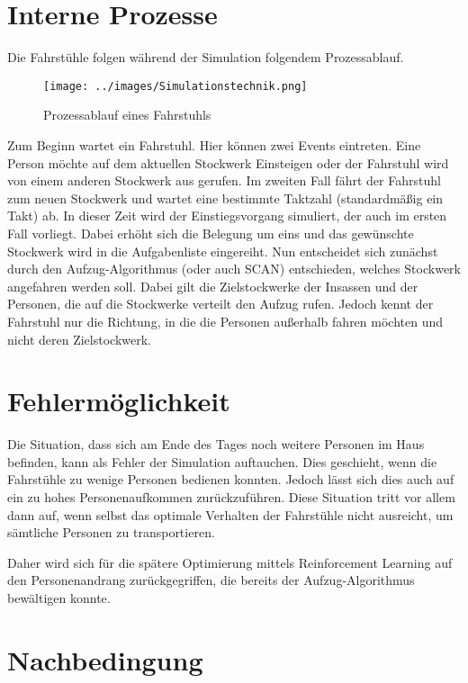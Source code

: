 \documentclass[envcountsame, envcountchap, deutsch]{i-studis}
\begin{document}
\hypertarget{interne-prozesse}{%
\section{Interne Prozesse}\label{interne-prozesse}}

Die Fahrstühle folgen während der Simulation folgendem Prozessablauf.

\begin{figure}
\centering
\texttt{[image: ../images/Simulationstechnik.png]}
\caption{Prozessablauf eines Fahrstuhls}
\end{figure}

Zum Beginn wartet ein Fahrstuhl. Hier können zwei Events eintreten. Eine
Person möchte auf dem aktuellen Stockwerk Einsteigen oder der Fahrstuhl
wird von einem anderen Stockwerk aus gerufen. Im zweiten Fall fährt der
Fahrstuhl zum neuen Stockwerk und wartet eine bestimmte Taktzahl
(standardmäßig ein Takt) ab. In dieser Zeit wird der Einstiegsvorgang
simuliert, der auch im ersten Fall vorliegt. Dabei erhöht sich die
Belegung um eins und das gewünschte Stockwerk wird in die Aufgabenliste
eingereiht. Nun entscheidet sich zunächst durch den Aufzug-Algorithmus
(oder auch SCAN) entschieden, welches Stockwerk angefahren werden soll.
Dabei gilt die Zielstockwerke der Insassen und der Personen, die auf die
Stockwerke verteilt den Aufzug rufen. Jedoch kennt der Fahrstuhl nur die
Richtung, in die die Personen außerhalb fahren möchten und nicht deren
Zielstockwerk.

\hypertarget{fehlermuxf6glichkeit}{%
\section{Fehlermöglichkeit}\label{fehlermuxf6glichkeit}}

Die Situation, dass sich am Ende des Tages noch weitere Personen im Haus
befinden, kann als Fehler der Simulation auftauchen. Dies geschieht,
wenn die Fahrstühle zu wenige Personen bedienen konnten. Jedoch lässt
sich dies auch auf ein zu hohes Personenaufkommen zurückzuführen. Diese
Situation tritt vor allem dann auf, wenn selbst das optimale Verhalten
der Fahrstühle nicht ausreicht, um sämtliche Personen zu transportieren.

Daher wird sich für die spätere Optimierung mittels Reinforcement
Learning auf den Personenandrang zurückgegriffen, die bereits der
Aufzug-Algorithmus bewältigen konnte.

\hypertarget{nachbedingung}{%
\section{Nachbedingung}\label{nachbedingung}}
\end{document}
